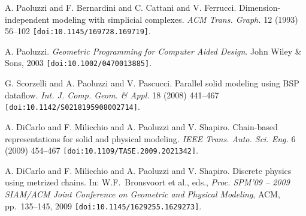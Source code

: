 
\begin{thebibliography}{10}

{\sc A. Paoluzzi and F. Bernardini and C. Cattani and V. Ferrucci}. {Dimension-independent modeling with simplicial complexes}. \textit{ACM Trans. Graph.} 12 (1993) 56--102 \texttt{[doi:10.1145/169728.169719]}.



{\sc A. Paoluzzi}. {\textit{Geometric Programming for Computer Aided Design}}. John Wiley \& Sons, 2003 \texttt{[doi:10.1002/0470013885]}.



{\sc G. Scorzelli and A. Paoluzzi and V. Pascucci}. {Parallel solid modeling using BSP dataflow}. \textit{Int. J. Comp. Geom. \& Appl.} 18 (2008) 441--467 \texttt{[doi:10.1142/S0218195908002714]}.



{\sc A. DiCarlo and F. Milicchio and A. Paoluzzi and V. Shapiro}. {Chain-based representations for solid and physical modeling}. \textit{IEEE Trans. Auto. Sci. Eng.} 6 (2009) 454--467 \texttt{[doi:10.1109/TASE.2009.2021342]}.



{\sc A. DiCarlo and F. Milicchio and A. Paoluzzi and V. Shapiro}. {Discrete physics using metrized chains}. In: W.F.~Bronsvoort et al., eds., \textit{Proc. SPM'09 -- 2009 SIAM/ACM Joint Conference on Geometric and Physical Modeling}, ACM, pp.~135--145, 2009 \texttt{[doi:10.1145/1629255.1629273]}.

\end{thebibliography}
